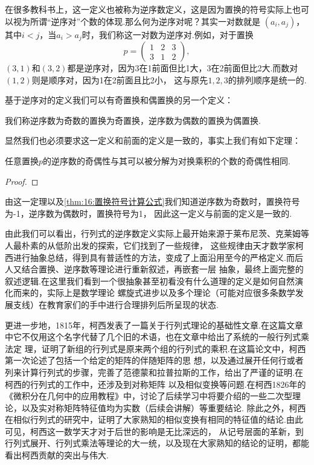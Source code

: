 在很多教科书上，这一定义也被称为逆序数定义，这是因为置换的符号实际上也可以视为所谓``逆序对''个数的体现.那么何为逆序对呢？其实一对数就是
$(a_i,a_j)$，其中$i<j$，当$a_i>a_j$时，我们称这一对数为逆序对.例如，对于置换
\[p=\begin{pmatrix}
    1&2&3\\
    3&1&2
\end{pmatrix},\]
$(3,1)$和$(3,2)$都是逆序对，因为3在1前面但比1大，3在2前面但比2大.而数对$(1,2)$则是顺序对，因为1在2前面且比2小，
这与原先$1,2,3$的排列顺序是统一的.

基于逆序对的定义我们可以有奇置换和偶置换的另一个定义：
\begin{definition}
    我们称逆序数为奇数的置换为奇置换，逆序数为偶数的置换为偶置换.
\end{definition}

显然我们也必须要求这一定义和前面的定义是一致的，事实上我们有如下定理：
\begin{theorem}
    任意置换$p$的逆序数的奇偶性与其可以被分解为对换乘积的个数的奇偶性相同.
\end{theorem}
\begin{proof}
    
\end{proof}

由这一定理以及\autoref{thm:16:置换符号计算公式}我们知道逆序数为奇数时，置换符号为-1，逆序数为偶数时，置换符号为1，
因此这一定义与前面的定义是一致的.

由此我们可以看出，行列式的逆序数定义实际上最开始来源于莱布尼茨、克莱姆等人最朴素的从低阶出发的探索，它们找到了一些规律，
这些规律由天才数学家柯西进行抽象总结，得到具有普适性的方法，变成了上面沿用至今的严格定义.而后人又结合置换、逆序数等理论进行重新叙述，再嵌套一层
抽象，最终上面完整的叙述逻辑.在这里我们看到一个很抽象甚至初看没有什么道理的定义是如何自然演化而来的，实际上是数学理论
螺旋式进步以及多个理论（可能对应很多条数学发展支线）在教育家们的手中进行合理排列后所呈现的状态.

更进一步地，1815年，柯西发表了一篇关于行列式理论的基础性文章.在这篇文章中它不仅用这个名字代替了几个旧的术语，也在文章中给出了系统的一般行列式乘法定
理，证明了新组的行列式是原来两个组的行列式的乘积.在这篇论文中，柯西第一次论述了包括一个给定的矩阵的伴随矩阵的思
想，以及通过展开任何行或者列来计算行列式的步骤，完善了范德蒙和拉普拉斯的工作，给出了严谨的证明.在柯西的行列式的工作中，还涉及到对称矩阵
以及相似变换等问题.在柯西1826年的
《微积分在几何中的应用教程》中，讨论了后续学习中将要介绍的一些二次型理论，以及实对称矩阵特征值均为实数（后续会讲解）等重要结论.
除此之外，柯西在相似行列式的研究中，证明了大家熟知的相似变换有相同的特征值的结论.由此可见，柯西这一数学天才对于后世的影响是无比深远的，
从记号层面的革新，到行列式展开、行列式乘法等理论的大一统，以及现在大家熟知的结论的证明，都能看出柯西贡献的突出与伟大.

